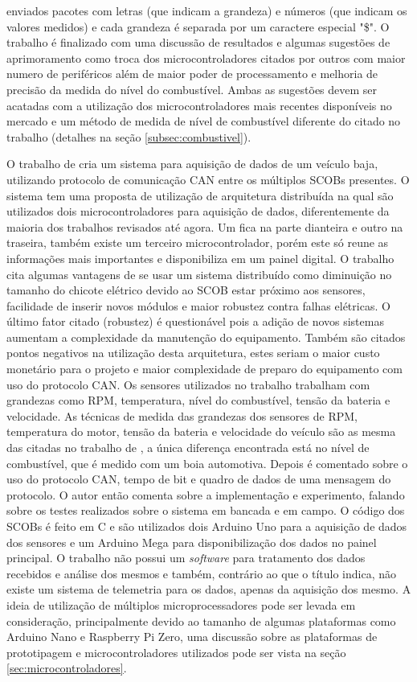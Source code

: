 enviados pacotes com letras (que indicam a grandeza) e números (que indicam os valores medidos) e cada grandeza é separada por um caractere especial "\$". O trabalho é finalizado com uma discussão de resultados e algumas sugestões de aprimoramento como troca dos microcontroladores citados por outros com maior numero de periféricos além de maior poder de processamento e melhoria de precisão da medida do nível do combustível. Ambas as sugestões devem ser acatadas com a utilização dos microcontroladores mais recentes disponíveis no mercado e um método de medida de nível de combustível diferente do citado no trabalho (detalhes na seção \ref{subsec:combustivel}).

O trabalho de  cria um sistema para aquisição de dados de um veículo baja, utilizando protocolo de comunicação CAN entre os múltiplos SCOBs presentes. O sistema tem uma proposta de utilização de arquitetura distribuída na qual são utilizados dois microcontroladores para aquisição de dados, diferentemente da maioria dos trabalhos revisados até agora. Um fica na parte dianteira e outro na traseira, também existe um terceiro microcontrolador, porém este só reune as informações mais importantes e disponibiliza em um painel digital. O trabalho cita algumas vantagens de se usar um sistema distribuído como diminuição no tamanho do chicote elétrico devido ao SCOB estar próximo aos sensores, facilidade de inserir novos módulos e maior robustez contra falhas elétricas. O último fator citado (robustez) é questionável pois a adição de novos sistemas aumentam a complexidade da manutenção do equipamento. Também são citados pontos negativos na utilização desta arquitetura, estes seriam o maior custo monetário para o projeto e maior complexidade de preparo do equipamento com uso do protocolo CAN. Os sensores utilizados no trabalho trabalham com grandezas como RPM, temperatura, nível do combustível, tensão da bateria e velocidade. As técnicas de medida das grandezas dos sensores de RPM, temperatura do motor, tensão da bateria e velocidade do veículo são as mesma das citadas no trabalho de , a única diferença encontrada está no nível de combustível, que é medido com um boia automotiva. Depois é comentado sobre o uso do protocolo CAN, tempo de bit e quadro de dados de uma mensagem do protocolo. O autor então comenta sobre a implementação e experimento, falando sobre os testes realizados sobre o sistema em bancada e em campo. O código dos SCOBs é feito em C e são utilizados dois Arduino Uno para a aquisição de dados dos sensores e um Arduino Mega para disponibilização dos dados no painel principal. O trabalho não possui um \textit{software} para tratamento dos dados recebidos e análise dos mesmos e também, contrário ao que o título indica, não existe um sistema de telemetria para os dados, apenas da aquisição dos mesmo. A ideia de utilização de múltiplos microprocessadores pode ser levada em consideração, principalmente devido ao tamanho de algumas plataformas como Arduino Nano e Raspberry Pi Zero, uma discussão sobre as plataformas de prototipagem e microcontroladores utilizados pode ser vista na seção \ref{sec:microcontroladores}.

